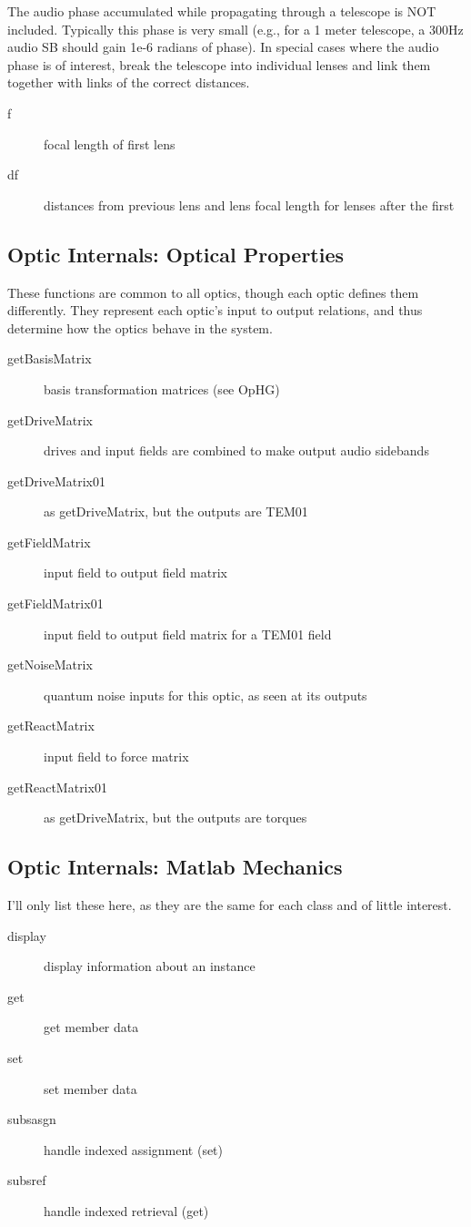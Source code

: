 \documentclass[12pt]{article}
\begin{document}
The audio phase accumulated while propagating through a telescope is NOT included.
Typically this phase is very small (e.g., for a 1 meter telescope, a 300Hz audio SB should gain 1e-6 radians of phase).
In special cases where the audio phase is of interest, break the telescope into individual lenses and link them together with links of the correct distances.

\begin{description}
  \item[f] focal length of first lens
  \item[df] distances from previous lens and lens focal length for lenses after the first
\end{description}

\subsection{Optic Internals: Optical Properties}

These functions are common to all optics, though each optic defines them differently.
They represent each optic's input to output relations, and thus determine how the optics behave in the system.

\begin{description}
  \item[getBasisMatrix] basis transformation matrices (see OpHG)
  \item[getDriveMatrix] drives and input fields are combined to make output audio sidebands
  \item[getDriveMatrix01] as getDriveMatrix, but the outputs are TEM01
  \item[getFieldMatrix] input field to output field matrix
  \item[getFieldMatrix01] input field to output field matrix for a TEM01 field
  \item[getNoiseMatrix] quantum noise inputs for this optic, as seen at its outputs
  \item[getReactMatrix] input field to force matrix
  \item[getReactMatrix01] as getDriveMatrix, but the outputs are torques
\end{description}

\subsection{Optic Internals: Matlab Mechanics}
I'll only list these here, as they are the same for each class and of little interest.

\begin{description}
  \item[display] display information about an instance
  \item[get] get member data
  \item[set] set member data
  \item[subsasgn] handle indexed assignment (set)
  \item[subsref] handle indexed retrieval (get)
\end{description}
\end{document}
